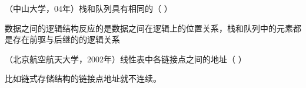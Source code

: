 \question （中山大学，04年）栈和队列具有相同的（ ）
\par{}
\begin{solution}数据之间的逻辑结构反应的是数据之间在逻辑上的位置关系，栈和队列中的元素都是存在前驱与后继的的逻辑关系
\end{solution}
\question （北京航空航天大学，2002年）线性表中各链接点之间的地址（ ）
\par{}
\begin{solution}比如链式存储结构的链接点地址就不连续。
\end{solution}
